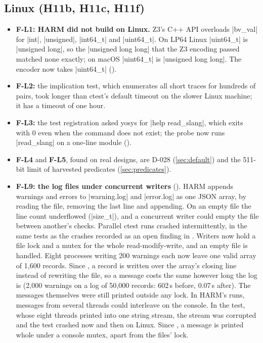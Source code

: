 \subsection{Linux (H11b, H11c, H11f)}
\begin{itemize}
\item \textbf{F-L1: HARM did not build on Linux.} Z3's C++ API overloads \code|bv_val| for \code|int|, \code|unsigned|, \code|int64_t| and \code|uint64_t|. On LP64 Linux \code|uint64_t| is \code|unsigned long|, so the \code|unsigned long long| that the Z3 encoding passed matched none exactly; on macOS \code|uint64_t| is \code|unsigned long long|. The encoder now takes \code|uint64_t| ().
\item \textbf{F-L2:} the implication test, which enumerates all short traces for hundreds of pairs, took longer than ctest's default timeout on the slower Linux machine; it has a timeout of one hour.
\item \textbf{F-L3:} the test registration asked yosys for \code|help read_slang|, which exits with 0 even when the command does not exist; the probe now runs \code|read_slang| on a one-line module ().
\item \textbf{F-L4} and \textbf{F-L5}, found on real designs, are D-028 (\cref{sec:default}) and the 511-bit limit of harvested predicates (\cref{sec:predicates}).
\item \textbf{F-L9: the log files under concurrent writers} (). HARM appends warnings and errors to \code|warning.log| and \code|error.log| as one JSON array, by reading the file, removing the last line and appending. On an empty file the line count underflowed (\code|size_t|), and a concurrent writer could empty the file between another's checks. Parallel ctest runs crashed intermittently, in the same tests as the crashes recorded as an open finding in . Writers now hold a file lock and a mutex for the whole read-modify-write, and an empty file is handled. Eight processes writing 200 warnings each now leave one valid array of 1{,}600 records. Since , a record is written over the array's closing line instead of rewriting the file, so a message costs the same however long the log is (2{,}000 warnings on a log of 50{,}000 records: 602\,s before, 0.07\,s after). The messages themselves were still printed outside any lock. In HARM's runs, messages from several threads could interleave on the console. In the test, whose eight threads printed into one string stream, the stream was corrupted and the test crashed now and then on Linux. Since , a message is printed whole under a console mutex, apart from the files' lock.
\end{itemize}

